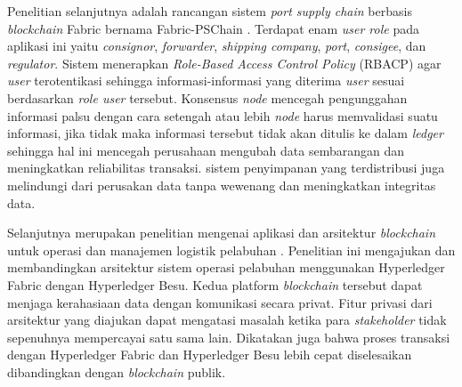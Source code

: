 Penelitian selanjutnya adalah rancangan sistem \textit{port supply chain} berbasis \textit{blockchain} Fabric bernama Fabric-PSChain \citep{Gao2022}. Terdapat enam \textit{user role} pada aplikasi ini yaitu \textit{consignor}, \textit{forwarder}, \textit{shipping company}, \textit{port}, \textit{consigee}, dan \textit{regulator}. Sistem menerapkan \textit{Role-Based Access Control Policy} (RBACP) agar \textit{user} terotentikasi sehingga informasi-informasi yang diterima \textit{user} sesuai berdasarkan \textit{role user} tersebut. Konsensus \textit{node} mencegah pengunggahan informasi palsu dengan cara setengah atau lebih \textit{node} harus memvalidasi suatu informasi, jika tidak maka informasi tersebut tidak akan ditulis ke dalam \textit{ledger} sehingga hal ini mencegah perusahaan mengubah data sembarangan dan meningkatkan reliabilitas transaksi. sistem penyimpanan yang terdistribusi juga melindungi dari perusakan data tanpa wewenang dan meningkatkan integritas data.

Selanjutnya merupakan penelitian mengenai aplikasi dan arsitektur \textit{blockchain} untuk operasi dan manajemen logistik pelabuhan \citep{Ahmad2021}. Penelitian ini mengajukan dan membandingkan arsitektur sistem operasi pelabuhan menggunakan Hyperledger Fabric dengan Hyperledger Besu. Kedua platform \textit{blockchain} tersebut dapat menjaga kerahasiaan data dengan komunikasi secara privat. Fitur privasi dari arsitektur yang diajukan dapat mengatasi masalah ketika para \textit{stakeholder} tidak sepenuhnya mempercayai satu sama lain. Dikatakan juga bahwa proses transaksi dengan Hyperledger Fabric dan Hyperledger Besu lebih cepat diselesaikan dibandingkan dengan \textit{blockchain} publik.
